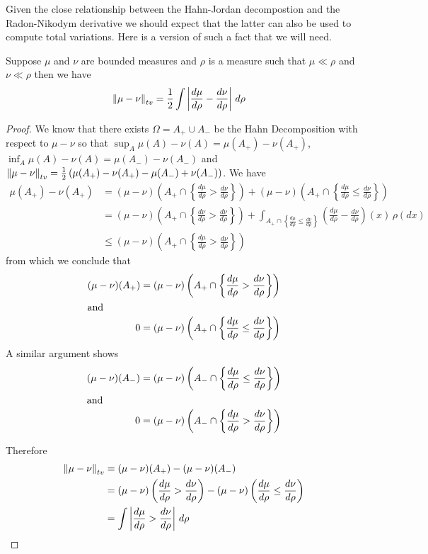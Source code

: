 Given the close relationship between the Hahn-Jordan decompostion and the Radon-Nikodym derivative we should expect that the latter can also be used
to compute total variations.  Here is a version of such a fact that we will need.
\begin{prop}\label{TotalVariationAndRadonNikodym} Suppose $\mu$ and $\nu$ are bounded measures and $\rho$ is a measure such that $\mu \ll \rho$ and $\nu \ll \rho$ then we have
\begin{align*}
\left \lVert  \mu - \nu \right \rVert_{tv} &= \frac{1}{2} \int \left \vert \frac{d\mu}{d \rho} - \frac{d\nu}{d \rho} \right \vert \, d\rho
\end{align*}
\end{prop}
\begin{proof}
We know that there exists $\Omega = A_+ \cup A_-$ be the Hahn Decomposition with respect to $\mu - \nu$ so that $\sup_A \mu(A) - \nu(A) = \mu(A_+) - \nu(A_+)$, $\inf_A \mu(A) - \nu(A) = \mu(A_-) - \nu(A_-)$ and  $\left \lVert  \mu- \nu \right \rVert_{tv} = \frac{1}{2} \left( \mu(A_+) - \nu(A_+) - \mu(A_-) + \nu(A_-) \right)$.  We have
\begin{align*}
\mu(A_+) - \nu(A_+) 
&= 
(\mu - \nu)\left(A_+ \cap \left \lbrace \frac{d\mu}{d \rho} > \frac{d\nu}{d \rho} \right \rbrace \right ) + 
 (\mu - \nu)\left(A_+ \cap \left \lbrace \frac{d\mu}{d \rho} \leq \frac{d\nu}{d \rho} \right \rbrace \right ) \\
&= 
(\mu - \nu)\left(A_+ \cap \left \lbrace \frac{d\nu}{d \rho} > \frac{d\nu}{d \rho} \right \rbrace \right ) + 
 \int_{A_+ \cap \left \lbrace \frac{d\mu}{d \rho} \leq \frac{d\nu}{d \rho} \right \rbrace} \left( \frac{d\mu}{d \rho} - \frac{d\nu}{d \rho} \right)(x) \, \rho(dx)\\
&\leq (\mu - \nu)\left(A_+ \cap \left \lbrace \frac{d\mu}{d \rho} > \frac{d\nu}{d \rho} \right \rbrace \right )
\end{align*}
from which we conclude that 
\begin{align*}
(\mu - \nu)(A_+) &= (\mu - \nu)\left(A_+ \cap \left \lbrace \frac{d\mu}{d \rho} > \frac{d\nu}{d \rho} \right \rbrace \right ) \\
\intertext{and}
0 &= (\mu - \nu)\left(A_+ \cap \left \lbrace \frac{d\mu}{d \rho} \leq \frac{d\nu}{d \rho} \right \rbrace \right )
\end{align*}
A similar argument shows 
\begin{align*}
(\mu - \nu)(A_-) &= (\mu - \nu)\left(A_- \cap \left \lbrace \frac{d\mu}{d \rho} \leq \frac{d\nu}{d \rho} \right \rbrace \right ) \\
\intertext{and}
0 &= (\mu - \nu)\left(A_- \cap \left \lbrace \frac{d\mu}{d \rho} > \frac{d\nu}{d \rho} \right \rbrace \right )
\end{align*}

Therefore
\begin{align*}
\left \lVert  \mu - \nu \right \rVert_{tv} &= (\mu - \nu)(A_+) - (\mu - \nu)(A_-) \\
&= (\mu - \nu)\left( \frac{d\mu}{d \rho} > \frac{d\nu}{d \rho} \right ) - (\mu - \nu)\left( \frac{d\mu}{d \rho} \leq \frac{d\nu}{d \rho} \right ) \\
&= \int \left \vert  \frac{d\mu}{d \rho} > \frac{d\nu}{d \rho}  \right \vert \, d\rho
\end{align*}
\end{proof}

